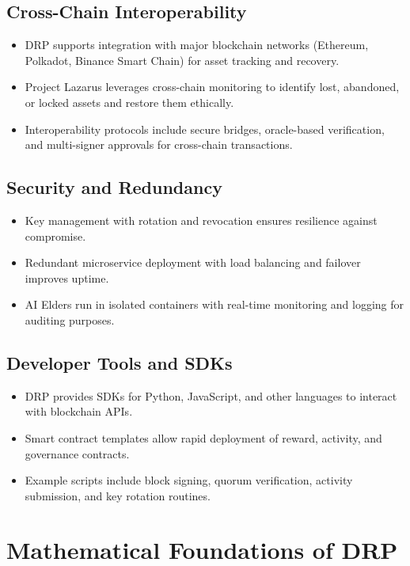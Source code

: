 \documentclass[11pt,a4paper]{article}
\begin{document}
\subsection{Cross-Chain Interoperability}
\begin{itemize}
    \item DRP supports integration with major blockchain networks (Ethereum, Polkadot, Binance Smart Chain) for asset tracking and recovery.  
    \item Project Lazarus leverages cross-chain monitoring to identify lost, abandoned, or locked assets and restore them ethically.  
    \item Interoperability protocols include secure bridges, oracle-based verification, and multi-signer approvals for cross-chain transactions.  
\end{itemize}

\subsection{Security and Redundancy}
\begin{itemize}
    \item Key management with rotation and revocation ensures resilience against compromise.  
    \item Redundant microservice deployment with load balancing and failover improves uptime.  
    \item AI Elders run in isolated containers with real-time monitoring and logging for auditing purposes.  
\end{itemize}

\subsection{Developer Tools and SDKs}
\begin{itemize}
    \item DRP provides SDKs for Python, JavaScript, and other languages to interact with blockchain APIs.  
    \item Smart contract templates allow rapid deployment of reward, activity, and governance contracts.  
    \item Example scripts include block signing, quorum verification, activity submission, and key rotation routines.  
\end{itemize}

\section{Mathematical Foundations of DRP}
\end{document}
